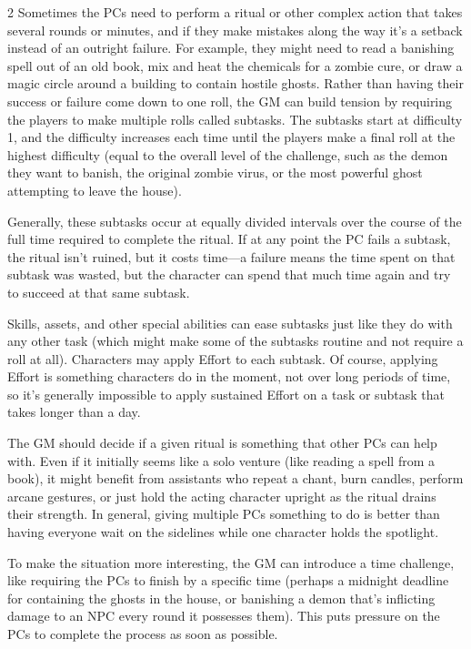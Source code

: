 \begin{multicols}{2}
Sometimes the PCs need to perform a ritual or other complex action that takes several rounds or minutes, and if they make mistakes along the way it’s a setback instead of an outright failure. For example, they might need to read a banishing spell out of an old book, mix and heat the chemicals for a zombie cure, or draw a magic circle around a building to contain hostile ghosts. Rather than having their success or failure come down to one roll, the GM can build tension by requiring the players to make multiple rolls called subtasks. The subtasks start at difficulty 1, and the difficulty increases each time until the players make a final roll at the highest difficulty (equal to the overall level of the challenge, such as the demon they want to banish, the original zombie virus, or the most powerful ghost attempting to leave the house).

Generally, these subtasks occur at equally divided intervals over the course of the full time required to complete the ritual. If at any point the PC fails a subtask, the ritual isn’t ruined, but it costs time—a failure means the time spent on that subtask was wasted, but the character can spend that much time again and try to succeed at that same subtask.

Skills, assets, and other special abilities can ease subtasks just like they do with any other task (which might make some of the subtasks routine and not require a roll at all). Characters may apply Effort to each subtask. Of course, applying Effort is something characters do in the moment, not over long periods of time, so it’s generally impossible to apply sustained Effort on a task or subtask that takes longer than a day.

The GM should decide if a given ritual is something that other PCs can help with. Even if it initially seems like a solo venture (like reading a spell from a book), it might benefit from assistants who repeat a chant, burn candles, perform arcane gestures, or just hold the acting character upright as the ritual drains their strength. In general, giving multiple PCs something to do is better than having everyone wait on the sidelines while one character holds the spotlight.

To make the situation more interesting, the GM can introduce a time challenge, like requiring the PCs to finish by a specific time (perhaps a midnight deadline for containing the ghosts in the house, or banishing a demon that’s inflicting damage to an NPC every round it possesses them). This puts pressure on the PCs to complete the process as soon as possible.


\end{multicols}
